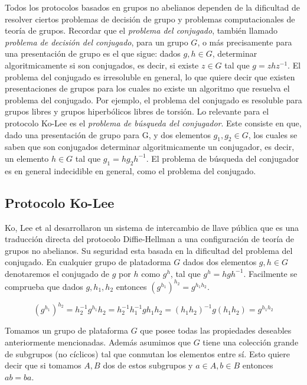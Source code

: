\documentclass[12pt]{article}
\theoremstyle{definition}
\begin{document}
Todos los protocolos basados en grupos no abelianos dependen de la dificultad de resolver ciertos problemas de decisión de grupo y problemas computacionales de teoría de grupos. Recordar que el \textit{problema del conjugado}, también llamado \textit{problema de decisión del conjugado}, para un grupo $G$, o más precisamente para una presentación de grupo es el que sigue: dados $g,h\in G$, determinar algoritmicamente si son conjugados, es decir, si existe $z\in G$ tal que $g = zhz^{-1}$. El problema del conjugado es irresoluble en general, lo que quiere decir que existen presentaciones de grupos para los cuales no existe un algoritmo que resuelva el problema del conjugado. Por ejemplo, el problema del conjugado es resoluble para grupos libres y grupos hiperbólicos libres de torsión.
\newline
\newline
Lo relevante para el protocolo Ko-Lee es el \textit{problema de búsqueda del conjugador}. Este consiste en que, dado una presentación de grupo para G, y dos elementos $g_1,g_2\in G$, los cuales se saben que son conjugados determinar algoritmicamente un conjugador, es decir, un elemento $h\in G$ tal que $g_1 = hg_2h^{-1}$. El problema de búsqueda del conjugador es en general indecidible en general, como el problema del conjugado.

\subsection{Protocolo Ko-Lee}
Ko, Lee et al desarrollaron un sistema de intercambio de llave pública que es una traducción  directa del protocolo Diffie-Hellman a una configuración de teoría de grupos no abelianos. Su seguridad esta basada en la dificultad del problema del conjugado. 
\newline
\newline
En cualquier grupo de platadorma $G$ dados dos elementos $g,h\in G$ denotaremos el conjugado de $g$ por $h$ como $g^h$, tal que $g^h = hgh^{-1}$. Facilmente se comprueba que dados $g,h_1,h_2$ entonces $(g^{h_1})^{h_2}=g^{h_1h_2}$.

$$(g^{h_1})^{h_2}= h_2^{-1}g^{h_1}h_2= h_2^{-1}h_1^{-1}gh_1h_2 = (h_1h_2)^{-1}g(h_1h_2) =g^{h_1h_2}$$

Tomamos un grupo de plataforma $G$ que posee todas las propiedades deseables anteriormente mencionadas. Además asumimos que $G$ tiene una colección grande de subgrupos (no cíclicos) tal que conmutan los elementos entre sí. Esto quiere decir que si tomamos $A,B$ dos de estos subgrupos y $a\in A, b \in B$ entonces $ab=ba$.
\end{document}
